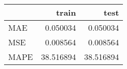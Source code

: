 \begin{tabular}{lrr}
\toprule
{} &      train &       test \\
\midrule
MAE  &   0.050034 &   0.050034 \\
MSE  &   0.008564 &   0.008564 \\
MAPE &  38.516894 &  38.516894 \\
\bottomrule
\end{tabular}
